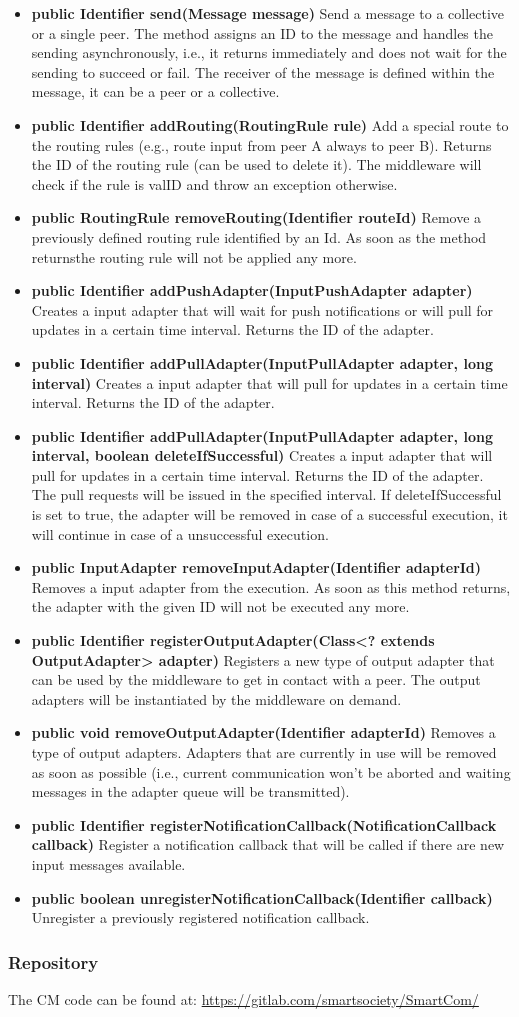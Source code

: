 \begin{itemize}
\item {\bf public Identifier send(Message message)} Send a message to a collective or a single peer. The method assigns an ID to the message and handles the sending asynchronously, i.e., it returns immediately and does not wait for the sending to succeed or fail. The receiver of the message is defined within the message, it can be a peer or a collective.
\item {\bf public Identifier addRouting(RoutingRule rule)} Add a special route to the routing rules (e.g., route input from peer A always to peer B). Returns the ID of the routing rule (can be used to delete it). The middleware will check if the rule is valID and throw an exception otherwise.
\item {\bf public RoutingRule removeRouting(Identifier routeId)} Remove a previously defined routing rule identified by an Id. As soon as the method returnsthe routing rule will not be applied any more. 
\item {\bf public Identifier addPushAdapter(InputPushAdapter adapter)} Creates a input adapter that will wait for push notifications or will pull for updates in a certain time interval. Returns the ID of the adapter.
 \item {\bf public Identifier addPullAdapter(InputPullAdapter adapter, long interval)} Creates a input adapter that will pull for updates in a certain time interval. Returns the ID of the adapter. 
 \item {\bf public Identifier addPullAdapter(InputPullAdapter adapter, long interval, boolean deleteIfSuccessful)} Creates a input adapter that will pull for updates in a certain time interval. Returns the ID of the adapter. The pull requests will be issued in the specified interval. If deleteIfSuccessful is set to true, the adapter will be removed in case of a successful execution, it will continue in case of a unsuccessful execution.
\item {\bf public InputAdapter removeInputAdapter(Identifier adapterId)}  Removes a input adapter from the execution. As soon as this method returns, the  adapter with the given ID will not be executed any more. 
\item {\bf public Identifier registerOutputAdapter(Class<? extends OutputAdapter> adapter)} Registers a new type of output adapter that can be used by the middleware to get in contact with a peer. The output adapters will be instantiated by the middleware on demand. 
\item {\bf public void removeOutputAdapter(Identifier adapterId)} Removes a type of output adapters. Adapters that are currently in use will be removed as soon as possible (i.e., current communication won’t be aborted and waiting messages in the adapter queue will be transmitted).
\item {\bf public Identifier registerNotificationCallback(NotificationCallback callback)} Register a notification callback that will be called if there are new input messages available.
\item {\bf public boolean unregisterNotificationCallback(Identifier callback)} Unregister a previously registered notification callback.
\end{itemize}  
\subsubsection{Repository}
The CM code can be found at: \url{https://gitlab.com/smartsociety/SmartCom/}
